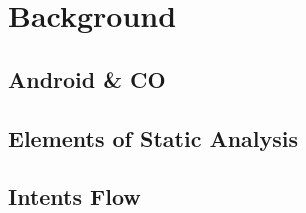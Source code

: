 \chapter{Background}
\section{Android \& CO}
\section{Elements of Static Analysis}
\section{Intents Flow}